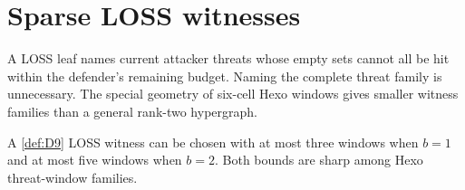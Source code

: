 \section{Sparse LOSS witnesses}
\label{sec:witnesses}

A LOSS leaf names current attacker threats whose empty sets cannot all be hit
within the defender's remaining budget.  Naming the complete threat family is
unnecessary.  The special geometry of six-cell Hexo windows gives smaller
witness families than a general rank-two hypergraph.

\begin{lemma}
\label{lem:L13}
A \cref{def:D9} LOSS witness can be chosen with at most three windows when
$b=1$ and at most five windows when $b=2$.  Both bounds are sharp among Hexo
threat-window families.
\end{lemma}

